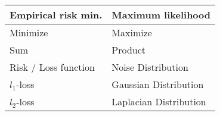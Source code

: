 \newline\newline
\begin{center}
\begin{tabular}{l|l}
Empirical risk min. & Maximum likelihood \\
\hline
Minimize & Maximize \\
Sum & Product \\
Risk / Loss function & Noise Distribution \\
$l_1$-loss & Gaussian Distribution\\
$l_2$-loss & Laplacian Distribution
\end{tabular}
\end{center}

